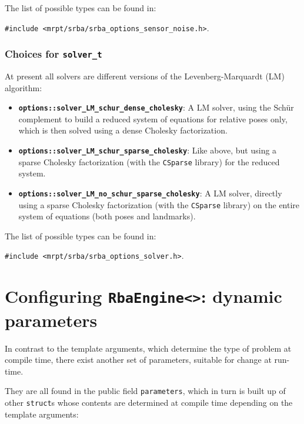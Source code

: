 \documentclass[a4paper,11pt]{article}
\begin{document}
The list of possible types can be found in: 

\texttt{\#include <mrpt/srba/srba\_options\_sensor\_noise.h>}.


\subsubsection{Choices for \texttt{solver\_t}}
\label{sect:choices.solvers}

At present all solvers are different versions of the Levenberg-Marquardt (LM) algorithm:

\begin{itemize}
\item{\textbf{ \texttt{options::solver\_LM\_schur\_dense\_cholesky}}: A LM solver, 
using the Sch\"ur complement to build a reduced system of equations for relative poses only, 
which is then solved using a dense Cholesky factorization.}

\item{\textbf{ \texttt{options::solver\_LM\_schur\_sparse\_cholesky}}: Like above, but 
using a sparse Cholesky factorization (with the \texttt{CSparse} library) for the reduced system.}

\item{\textbf{ \texttt{options::solver\_LM\_no\_schur\_sparse\_cholesky}}: A LM solver,
directly using a sparse Cholesky factorization (with the \texttt{CSparse} library) on 
the entire system of equations (both poses and landmarks).}

\end{itemize}

The list of possible types can be found in: 

\texttt{\#include <mrpt/srba/srba\_options\_solver.h>}.


\section{Configuring \texttt{RbaEngine<>}: dynamic parameters}
\label{sect:rba_dyn_parameters}

In contrast to the template arguments, which determine the type of problem at compile time, 
there exist another set of parameters, suitable for change at run-time.

They are all found in the public field \texttt{parameters}, which 
in turn is built up of other \texttt{struct}s whose contents are determined
at compile time depending on the template arguments:
\end{document}
